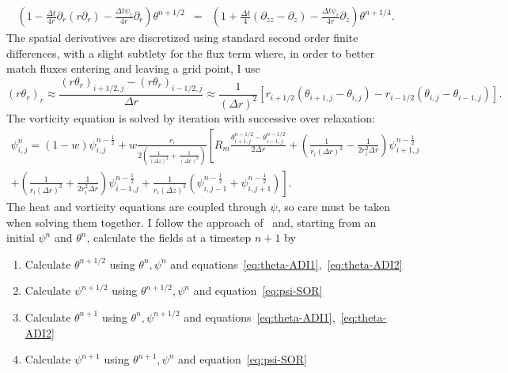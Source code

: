 \documentclass[11pt]{proc}
\begin{document}
\begin{appendices}
\begin{eqnarray}
\left(1 - \frac{\Delta t}{4 r} \partial_r (r \partial_r) - \frac{\Delta t \psi_z}{4 r} \partial_r \right) \theta^{n+1/2} &=& \left( 1 + \frac{\Delta t}{4} (\partial_{zz}-\partial_z) - \frac{\Delta t \psi_r}{4 r} \partial_z \right) \theta^{n+1/4}  .  \label{eq:theta-ADI2}
\end{eqnarray}
The spatial derivatives are discretized using standard second order finite differences, with a slight subtlety for the flux term where, in order to better match fluxes entering and leaving a grid point, I use
\begin{equation}
(r \theta_r)_r \approx \frac{(r \theta_r)_{i+1/2, j} - (r \theta_r)_{i-1/2,j}}{ \Delta r} \approx \frac{1}{(\Delta r)^2} \left[ r_{i+1/2} \left( \theta_{i+1, j} - \theta_{i, j} \right) - r_{i-1/2} \left( \theta_{i, j} - \theta_{i-1, j} \right)\right].
\end{equation}
The vorticity equation is solved by iteration with successive over relaxation:
\begin{multline}
\label{eq:psi-SOR}
  \psi^n_{i,j} = (1-w) \psi_{i,j}^{n-\frac{1}{2}} + w \frac{r_i}{2 \left( \frac{1}{(\Delta z)^2} + \frac{1}{(\Delta r)^2}\right)} \left[  R_m  \frac{\theta^{n-1/2}_{i+1, j} - \theta^{n-1/2}_{i-1, j}}{2 \Delta r} + \left(\frac{1}{r_i (\Delta r)^2} - \frac{1}{2 r_i^2 \Delta r} \right) \psi^{n-\frac{1}{2}}_{i+1, j}           \right.   \\ +   \left.             
                 \left(\frac{1}{r_i (\Delta r)^2} + \frac{1}{2 r_i^2 \Delta r} \right) \psi^{n-\frac{1}{2}}_{i-1, j} + \frac{1}{r_i (\Delta z)^2} \left(\psi^{n-\frac{1}{2}}_{i,j-1} + \psi^{n-\frac{1}{2}}_{i, j+1} \right)                         \right]  .
\end{multline}
The heat and vorticity equations are coupled through $\psi$, so care must be taken when solving them together. I follow the approach of~\citet*{hewitt-14} and, starting from an initial $\psi^n$ and $\theta^n$, calculate the fields at a timestep $n+1$ by
\begin{enumerate}
	\item Calculate $\theta^{n+1/2}$ using $\theta^n, \psi^n$ and equations~\eqref{eq:theta-ADI1},~\eqref{eq:theta-ADI2}
	\item Calculate $\psi^{n+1/2}$ using $\theta^{n+1/2}, \psi^n$ and equation~\eqref{eq:psi-SOR}
	\item Calculate $\theta^{n+1}$ using $\theta^n, \psi^{n+1/2}$ and equations~\eqref{eq:theta-ADI1},~\eqref{eq:theta-ADI2}
	\item Calculate $\psi^{n+1}$ using $\theta^{n+1}, \psi^n$ and equation~\eqref{eq:psi-SOR}
\end{enumerate}




\end{appendices}
\end{document}
